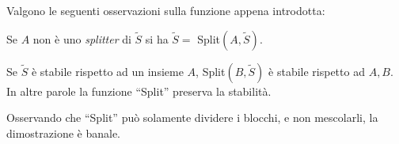 Valgono le seguenti osservazioni sulla funzione appena introdotta:
\begin{observation}
    Se $A$ non è uno \emph{splitter} di $\widetilde{S}$ si ha $\widetilde{S} = $ Split$(A,\widetilde{S})$.
\end{observation}
\begin{observation}
    \label{obs:split_eredita}
    Se $\widetilde{S}$ è stabile rispetto ad un insieme $A$, Split$(B,\widetilde{S})$ è stabile rispetto ad $A,B$. In altre parole la funzione ``Split'' preserva la stabilità.
\end{observation}
\begin{proof2}
    Osservando che ``Split'' può solamente dividere i blocchi, e non mescolarli, la dimostrazione è banale.
\end{proof2}

